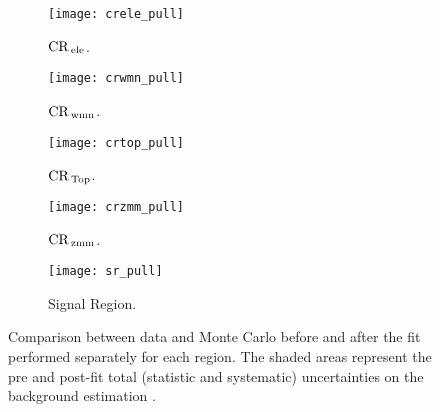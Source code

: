 \begin{figure}[!th]
  \centering
  \begin{subfigure}[t]{.48\linewidth}
    \texttt{[image: crele\_pull]}
    \caption{$\mathrm{CR}_\mathrm{\, ele}$.}
    \label{fig:crele_pull}
  \end{subfigure}
  \begin{subfigure}[t]{.48\linewidth}
    \texttt{[image: crwmn\_pull]}
    \caption{$\mathrm{CR}_\mathrm{\, wmn}$.}
    \label{fig:crwnm_pull}
  \end{subfigure}
  \begin{subfigure}[t]{.48\linewidth}
    \texttt{[image: crtop\_pull]}
    \caption{$\mathrm{CR}_\mathrm{\, Top}$.}
    \label{fig:crtop_pull}
  \end{subfigure}
    \begin{subfigure}[t]{.48\linewidth}
    \texttt{[image: crzmm\_pull]}
    \caption{$\mathrm{CR}_\mathrm{\, zmm}$.}
    \label{fig:crzmm_pull}
  \end{subfigure}
  \begin{subfigure}[t]{.48\linewidth}
    \texttt{[image: sr\_pull]}
    \caption{Signal Region.}
    \label{fig:sr_pull}
  \end{subfigure}
  \caption{Comparison between data and Monte Carlo before and after the fit
    performed separately for each region. The shaded areas represent the pre and
    post-fit total (statistic and systematic) uncertainties on the background
    estimation .}
  \label{fig:reagion_pulls}
\end{figure}
